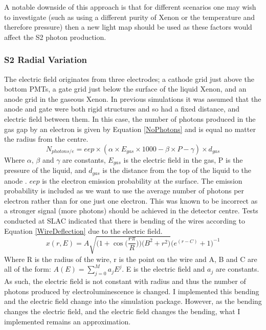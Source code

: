 \par
A notable downside of this approach is that for different scenarios one may wish to investigate (such as using a different purity of Xenon or the temperature and therefore pressure) then a new light map should be used as these factors would affect the S2 photon production.



\subsubsection{S2 Radial Variation} \label{S2RadialVariation}
\par
The electric field originates from three electrodes; a cathode grid just above the bottom PMTs, a gate grid just below the surface of the liquid Xenon, and an anode grid in the gaseous Xenon.
In previous simulations it was assumed that the anode and gate were both rigid structures and so had a fixed distance, and electric field between them.
In this case, the number of photons produced in the gas gap by an electron is given by Equation \ref{NoPhotons} and is equal no matter the radius from the centre. 
\begin{equation}
    N_{photons/e} = eep \times (\alpha \times E_{gas} \times 1000 - \beta \times P - \gamma) \times d_{gas}
    \label{NoPhotons}
\end{equation}
Where $\alpha$, $\beta$ and $\gamma$ are constants, $E_{gas}$ is the electric field in the gas, P is the pressure of the liquid, and $d_{gas}$ is the distance from the top of the liquid to the anode \cite{NoPhotonsPerElectron}.
$eep$ is the electron emission probability at the surface.
The emission probability is included as we want to use the average number of photons per electron rather than for one just one electron.
This was known to be incorrect as a stronger signal (more photons) should be achieved in the detector centre.
Tests conducted at SLAC indicated that there is bending of the wires according to Equation \ref{WireDeflection} due to the electric field.
\begin{equation}
    x(r,E) = A \sqrt{ \bigg( 1 + \cos{ \Big( \frac{r \pi}{R} } \Big) \bigg) \bigg( B^2 + r^2 \bigg) } \bigg( e^{(r-C)} + 1 \bigg)^{-1} 
    \label{WireDeflection}
\end{equation}
Where R is the radius of the wire, r is the point on the wire and A, B and C are all of the form: $A(E) = \sum_{j=0}^{M} a_{j} E^{j}$. E is the electric field and $a_{j}$ are constants.
As such, the electric field is not constant with radius and thus the number of photons produced by electroluminescence is changed.
I implemented this bending and the electric field change into the simulation package.
However, as the bending changes the electric field, and the electric field changes the bending, what I implemented remains an approximation.
